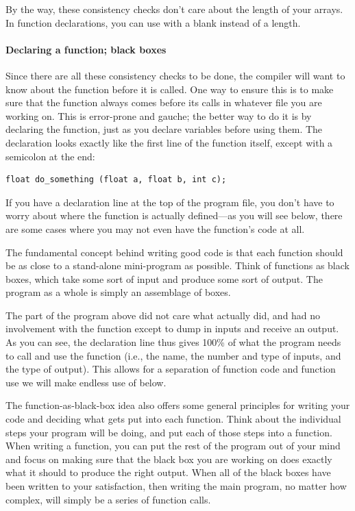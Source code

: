 \documentclass[12pt]{article}
\begin{document}
By the way, these consistency checks don't care about the length of
your arrays. In function declarations, you can use 
with a blank instead of a length.  

\paragraph{Declaring a function; black boxes} 
Since there are all these consistency
checks to be done, the compiler will want to know about the function
before it is called. One way to ensure this is to make sure that
the function always comes before its calls in whatever file you are
working on. This is error-prone and gauche; the better way to do it is
by declaring the function, just as you declare variables before using
them. The declaration looks exactly like the first line of the function
itself, except with a semicolon at the end:

\begin{lstlisting}
float do_something (float a, float b, int c);
\end{lstlisting}

If you have a declaration line at the top of the program file, you don't
have to worry about where the function is actually defined---as
you will see below, there are some cases where you may not even have the
function's code at all. 

The fundamental concept behind writing good code is
that each function should be as close to a stand-alone mini-program as
possible. Think of functions as black boxes, which take some sort of
input and produce some sort of output. The program as a whole is
simply an assemblage of boxes.

The  part of the program above did not care what
 actually did, and had no involvement with the
function except to dump in inputs and receive an output. As you can see,
the declaration line thus gives 100\% of what the program needs to call
and use the function (i.e., the name, the number and type of inputs,
and the type of output). This allows for a separation of function code
and function use we will make endless use of below.

The function-as-black-box idea also offers some general principles for
writing your code and deciding what gets put into each function. Think
about the individual steps your program will be doing, and put each
of those steps into a function. When writing a function, you
can put the rest of the program out of your mind and focus on making
sure that the black box you are working on does exactly what it should
to produce the right output. When all of the black boxes have been written to
your satisfaction, then writing the main program, no matter how complex,
will simply be a series of function calls.
\end{document}

